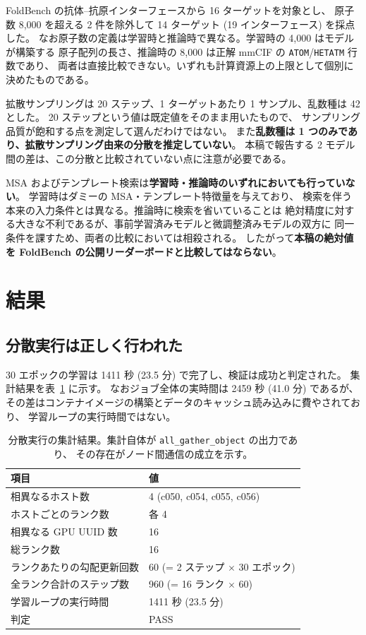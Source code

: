 \documentclass[11pt,a4paper]{article}
\begin{document}
FoldBench の抗体--抗原インターフェースから 16 ターゲットを対象とし、
原子数 8,000 を超える 2 件を除外して 14 ターゲット (19 インターフェース) を採点した。
なお原子数の定義は学習時と推論時で異なる。学習時の 4,000 はモデルが構築する
原子配列の長さ、推論時の 8,000 は正解 mmCIF の \texttt{ATOM}/\texttt{HETATM} 行数であり、
両者は直接比較できない。いずれも計算資源上の上限として個別に決めたものである。

拡散サンプリングは 20 ステップ、1 ターゲットあたり 1 サンプル、乱数種は 42 とした。
20 ステップという値は既定値をそのまま用いたもので、
サンプリング品質が飽和する点を測定して選んだわけではない。
また\textbf{乱数種は 1 つのみであり、拡散サンプリング由来の分散を推定していない}。
本稿で報告する 2 モデル間の差は、この分散と比較されていない点に注意が必要である。

MSA およびテンプレート検索は\textbf{学習時・推論時のいずれにおいても行っていない}。
学習時はダミーの MSA・テンプレート特徴量を与えており、
検索を伴う本来の入力条件とは異なる。推論時に検索を省いていることは
絶対精度に対する大きな不利であるが、事前学習済みモデルと微調整済みモデルの双方に
同一条件を課すため、両者の比較においては相殺される。
したがって\textbf{本稿の絶対値を FoldBench の公開リーダーボードと比較してはならない}。

\section{結果}

\subsection{分散実行は正しく行われた}
\label{sec:placement}

30 エポックの学習は 1411 秒 (23.5 分) で完了し、検証は成功と判定された。
集計結果を表~\ref{tab:placement} に示す。
なおジョブ全体の実時間は 2459 秒 (41.0 分) であるが、
その差はコンテナイメージの構築とデータのキャッシュ読み込みに費やされており、
学習ループの実行時間ではない。

\begin{table}[htbp]
\centering
\caption{分散実行の集計結果。集計自体が \texttt{all\_gather\_object} の出力であり、
その存在がノード間通信の成立を示す。}
\label{tab:placement}
\begin{tabular}{ll}
\toprule
項目 & 値 \\
\midrule
相異なるホスト数 & 4 (c050, c054, c055, c056) \\
ホストごとのランク数 & 各 4 \\
相異なる GPU UUID 数 & 16 \\
総ランク数 & 16 \\
ランクあたりの勾配更新回数 & 60 (= 2 ステップ $\times$ 30 エポック) \\
全ランク合計のステップ数 & 960 (= 16 ランク $\times$ 60) \\
学習ループの実行時間 & 1411 秒 (23.5 分) \\
判定 & PASS \\
\bottomrule
\end{tabular}
\end{table}
\end{document}
